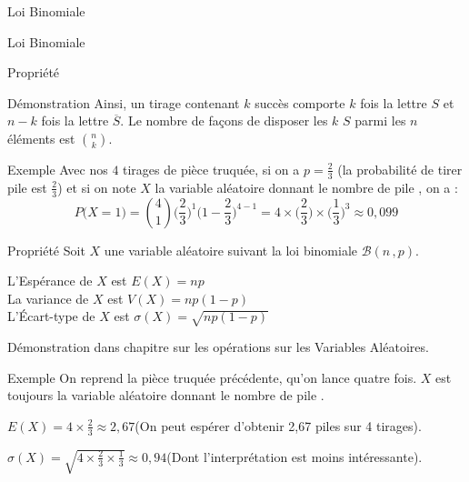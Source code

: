\documentclass{cours}
\begin{document}
\begin{Gpartie}{Loi Binomiale}
\begin{Spartie}{Loi Binomiale}
\begin{SSpartie}{Propriété}
\begin{SSSpartie}{Démonstration}
                    Ainsi, un tirage contenant $k$ succès comporte $k$ fois la lettre $S$ et $n-k$ fois la lettre $\overline{S}$. Le nombre de façons de disposer les $k$ \og $S$ \fg{} parmi les $n$ éléments est $\binom{n}{k}$.
                \end{SSSpartie}
                \begin{SSSpartie}{Exemple} 
                    Avec nos $4$ tirages de pièce truquée, si on a $p=\frac{2}{3}$ (la probabilité de tirer \og pile \fg{} est $\frac{2}{3}$) et si on note $X$ la variable aléatoire donnant le nombre de \og pile \fg{}, on a :
                    \[P\big(X=1\big)=\binom{4}{1}\Bigg(\frac{2}{3}\Bigg)^1\Bigg(1-\frac{2}{3}\Bigg)^{4-1}=4\times\Bigg(\frac{2}{3}\Bigg)\times\Bigg(\frac{1}{3}\Bigg)^3\approx 0{,}099\]
                \end{SSSpartie}
            \end{SSpartie}
            \begin{SSpartie}{Propriété} 
                Soit $X$ une variable aléatoire suivant la loi binomiale $\mathcal{B}(n\,, p)$.

                L'Espérance de $X$ est $\boxed{E(X)=np}$ \\ La variance de $X$ est $\boxed{V(X)=np(1-p)}$ \\ L'Écart-type de $X$ est $\boxed{\sigma(X)=\sqrt{np(1-p)}}$

                Démonstration dans chapitre sur les opérations sur les Variables Aléatoires.
                \begin{SSSpartie}{Exemple} 
                    On reprend la pièce truquée précédente, qu'on lance quatre fois. $X$ est toujours la variable aléatoire donnant le nombre de \og pile \fg.

                    $E(X)=4\times\frac{2}{3}\approx 2{,}67$\quad (On peut espérer d'obtenir 2{,}67 piles sur 4 tirages).

                    $\sigma(X)=\sqrt{4\times\frac{2}{3}\times\frac{1}{3}}\approx 0{,}94$\quad (Dont l'interprétation est moins intéressante).
                \end{SSSpartie}
            \end{SSpartie}
        \end{Spartie}
    \end{Gpartie}
\end{document}
